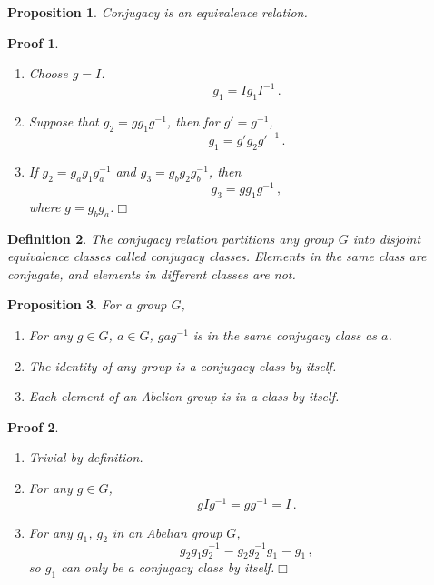 \documentclass{article}
\theoremstyle{plain}\theoremheaderfont{\normalfont\itshape}\theorembodyfont{\rmfamily}\theoremseparator{.}\newtheorem*{rem}{Remark}\newtheorem*{ex}{Example}\newtheorem*{proof}{Proof}\newtheorem*{altp}{Alternative proof}
\theoremstyle{plain}\theoremheaderfont{\normalfont\bfseries}\theorembodyfont{\rmfamily}\theoremseparator{.}\newtheorem{thm}{Theorem}[section]\newtheorem{lem}[thm]{Lemma}\newtheorem{prop}[thm]{Proposition}\newtheorem*{cor}{Corollary}\newtheorem{defn}[thm]{Definition}\newtheorem{clm}[thm]{Claim}\newtheorem{clminproof}{Claim}
\theoremstyle{break}\theoremheaderfont{\normalfont\itshape}\theorembodyfont{\rmfamily}\theoremseparator{.\medskip}\newtheorem*{proofskip}{Proof}\newtheorem*{exs}{Examples}\newtheorem*{rems}{Remarks}
\theoremstyle{break}\theoremheaderfont{\normalfont\bfseries}\theorembodyfont{\rmfamily}\theoremseparator{.\medskip}\newtheorem{lemskip}[thm]{Lemma}\newtheorem{defnskip}[thm]{Definition}\newtheorem{propskip}[thm]{Proposition}\newtheorem{thmskip}[thm]{Theorem}
\numberwithin{equation}{section}
\newcommand{\qed}{\hfill\ensuremath{\Box}}
\begin{document}
	\begin{prop}
		Conjugacy is an equivalence relation.
	\end{prop}
	\begin{proofskip}
		\begin{enumerate}[topsep=0pt]
			\item Choose \(g=I\).
			\[g_1=Ig_1I^{-1}\,.\]
			\item Suppose that \(g_2=gg_1g^{-1}\), then for \(g'=g^{-1}\),
			\[g_1=g'g_2g'^{-1}\,.\]
			\item If \(g_2=g_ag_1g_a^{-1}\) and \(g_3=g_bg_2g_b^{-1}\), then
			\[g_3=gg_1g^{-1}\,,\]
			where \(g=g_bg_a\).\qed
		\end{enumerate}
	\end{proofskip}
	\begin{defn}
		The conjugacy relation partitions any group \(G\) into disjoint equivalence classes called \textit{conjugacy classes}. Elements in the same class are conjugate, and elements in different classes are not.
	\end{defn}
	\begin{prop}
		For a group \(G\),
		\begin{enumerate}[topsep=0pt]
			\item For any \(g\in G\), \(a\in G\), \(gag^{-1}\) is in the same conjugacy class as \(a\).
			\item The identity of any group is a conjugacy class by itself.
			\item Each element of an Abelian group is in a class by itself.
		\end{enumerate}
	\end{prop}
	\begin{proofskip}
		\begin{enumerate}[topsep=0pt]
			\item Trivial by definition.
			\item For any \(g\in G\),
			\[gIg^{-1}=gg^{-1}=I\,.\]
			\item For any \(g_1\), \(g_2\) in an Abelian group \(G\),
			\[g_2g_1g_2^{-1}=g_2g_2^{-1}g_1=g_1\,,\]
			so \(g_1\) can only be a conjugacy class by itself.\qed
		\end{enumerate}
	\end{proofskip}
\end{document}

